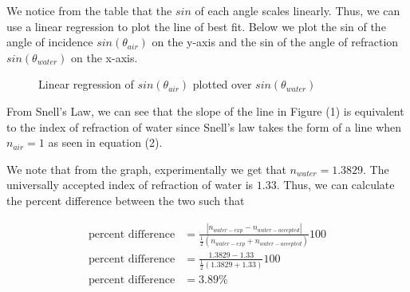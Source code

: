 \documentclass[12pt]{article}
\begin{document}
We notice from the table that the $sin$ of each angle scales linearly. Thus, we can use a linear regression to plot the line of best fit. Below we plot the sin of the angle of incidence $sin(\theta_{air})$ on the y-axis and the sin of the angle of refraction $sin(\theta_{water})$ on the x-axis.

\begin{figure}[H]
    \centering

    \caption[10pt]{Linear regression of $sin(\theta_{air})$ plotted over $sin(\theta_{water})$}

\end{figure}

From Snell's Law, we can see that the slope of the line in Figure (1) is equivalent to the index of refraction of water since Snell's law takes the form of a line when $n_{air} = 1$ as seen in equation (2).

We note that from the graph, experimentally we get that $n_{water} = 1.3829$. The universally accepted index of refraction of water is $1.33$. Thus, we can calculate the percent difference between the two such that

\begin{equation}
    \begin{split}
        \text{percent difference} &= \frac{|n_{water-exp} - n_{water-accepted}|}{\frac{1}{2}(n_{water-exp} + n_{water-accepted})}100 \\
        \text{percent difference} &= \frac{1.3829 - 1.33}{\frac{1}{2}(1.3829 + 1.33)}100 \\
        \text{percent difference} &= 3.89 \%
    \end{split}
\end{equation}
\end{document}

